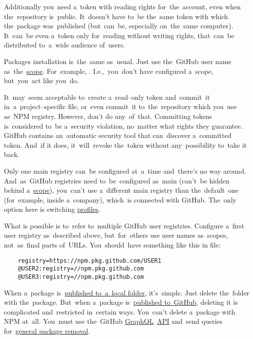 Additionally you~need a~token with reading rights for~the~account, even when the~repository is~public.
It~doesn't have to~be the~same token with which the~package was~published (but~can~be, especially on~the~same computer).
It~can~be even a~token only for~reading without writing rights, that~can~be distributed to~a~wide audience of~users.

Packages installation is~the~same as~usual.
Just use the~GitHub user name as~the~\hyperref[nsmscopedpackages]{scope}.
For~example, .
I.e.,~you~don't have configured a~scope, but~you~act like you~do.

\warning It~may~seem acceptable to~create a~read--only token and~commit~it in~a~project--specific  file, or~even commit~it to~the~repository which you~use as~NPM registry.
However, don't do any~of~that.
Committing tokens is~considered to~be a~security violation, no~matter what rights they guarantee.
GitHub contains an~automatic security tool that can~discover a~committed token.
And~if it does, it~will~revoke the~token without any~possibility to~take it back.

\label{multipleregistries}
Only one main registry can~be configured at~a~time and~there's no way around.
And~as~GitHub registries need to~be~configured as~main (can't~be hidden behind a~\hyperref[npmscope]{scope}), you~can't use a~different main registry than the~default~one (for~example, inside a~company), which~is connected with GitHub.
The~only option here is switching \hyperref[npmprofile]{profiles}.

What is possible is to~refer to~multiple GitHub user registries.
Configure a~first user registry as~described above, but~for~others use user names as~scopes, not~as~final parts of~URLs.
You~should~have something like this in  file:
\begin{lstlisting}
    registry=https://npm.pkg.github.com/USER1
    @USER2:registry=//npm.pkg.github.com
    @USER3:registry=//npm.pkg.github.com
\end{lstlisting}

When a~package is~\hyperref[npmpublishlocal]{published to~a~local folder}, it's~simple.
Just delete the~folder with the~package.
But~when a~package is~\hyperref[npmpublishgithub]{published to~GitHub}, deleting it is complicated and~restricted in~certain ways.
You~can't delete a~package with NPM at~all.
You~must use the~GitHub \hyperref[graphql]{GraphQL}~\hyperref[api]{API} and~send queries for~\hyperref[githubdeletepackage]{general package removal}.
